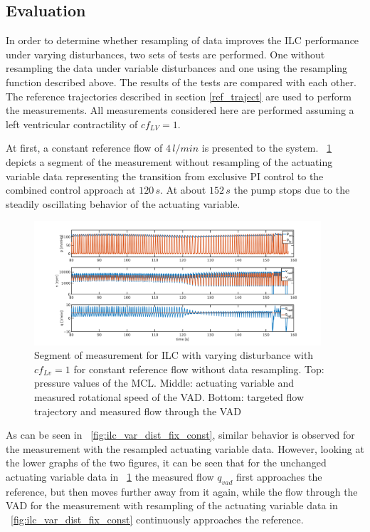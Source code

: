 \subsection{Evaluation}
In order to determine whether resampling of data improves the ILC performance under varying disturbances, two sets of tests are performed. One without resampling the data under variable disturbances and one using the resampling function described above. The results of the tests are compared with each other.
The reference trajectories described in section \ref{ref_traject} are used to perform the measurements. All measurements considered here are performed assuming a left ventricular contractility of $cf_{LV}=1$.


At first, a constant reference flow of $4\,l/min$ is presented to the system. \figurename~\ref{fig:ilc_var_dist_unfix_const} depicts a segment of the measurement without resampling of the actuating variable data representing the transition from exclusive PI control to the combined control approach at $120\,s$. At about $152\,s$ the pump stops due to the steadily oscillating behavior of the actuating variable.
\begin{figure}[ht!]
  \centering
  \includegraphics[width=0.95\textwidth]{images/chapt_5/ILC/ilc_var_dist_unfix_const.pdf}
  \caption[Segment of measurement for ILC with varying disturbance with $cf_{Lv}=1$ for constant reference flow without data resampling]{Segment of measurement for ILC with varying disturbance with $cf_{Lv}=1$ for constant reference flow without data resampling. Top:  pressure values of the MCL. Middle: actuating variable and measured rotational speed of the VAD. Bottom: targeted flow trajectory and measured flow through the VAD}
  \label{fig:ilc_var_dist_unfix_const}
\end{figure}
As can be seen in \figurename~\ref{fig:ilc_var_dist_fix_const}, similar behavior is observed for the measurement with the resampled actuating variable data.
However, looking at the lower graphs of the two figures, it can be seen that for the unchanged actuating variable data in \figurename~\ref{fig:ilc_var_dist_unfix_const} the measured flow $q_{vad}$ first approaches the reference, but then moves further away from it again, while the flow through the VAD for the measurement with resampling of the actuating variable data in \figurename~\ref{fig:ilc_var_dist_fix_const} continuously approaches the reference.
